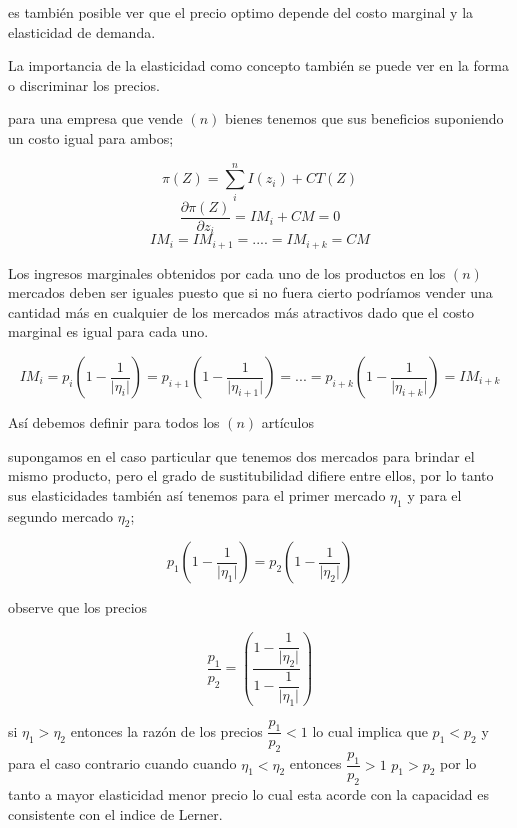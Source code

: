 \documentclass[12pt]{article}
\providecommand{\abs}[1]{\lvert#1\rvert}
\begin{document}
es también posible ver que el precio optimo depende del costo marginal y la elasticidad de demanda.




La importancia de la elasticidad como concepto también se puede ver en la forma o discriminar los precios.

para una empresa que vende $(n)$ bienes tenemos que sus beneficios suponiendo un costo igual para ambos;

$$\pi(Z)=\sum_{i}^{n}I(z_{i}) + CT(Z)$$
$$\dfrac{\partial \pi(Z)}{\partial z_{i}}=IM_{i}+CM=0$$
$$IM_{i}=IM_{i+1}=....=IM_{i+k}=CM$$

Los ingresos marginales obtenidos por cada uno de los productos en los $(n)$ mercados deben ser iguales puesto que si no fuera cierto podríamos vender una cantidad más en cualquier de los mercados más atractivos dado que el costo marginal es igual para cada uno.




$$IM_{i}=p_{i}\left(1-\dfrac{1}{\abs{\eta_{i}}}\right)= p_{i+1}\left(1-\dfrac{1}{\abs{\eta_{i+1}}}\right) =  ... = p_{i+k}\left(1-\dfrac{1}{\abs{\eta_{i+k}}}\right) = IM_{i+k} $$







Así debemos definir para todos los $(n)$ artículos 


supongamos en el caso particular que tenemos dos mercados para brindar el mismo producto, pero el grado de sustitubilidad difiere entre ellos, por lo tanto sus elasticidades también así tenemos para el primer mercado $\eta_{1}$ y para el segundo mercado $\eta_{2}$;




$$p_{1}\left(1-\dfrac{1}{\abs{\eta_{1}}}\right) =p_{2}\left(1-\dfrac{1}{\abs{\eta_{2}}}\right)$$

observe que los precios 

$$ \dfrac{p_{1}}{p_{2}} = \left( \dfrac {1-\dfrac {1} {\abs {\eta_{2}} }} { 1 -\dfrac {1} { \abs { \eta_{1}}}}\right)   $$

si $\eta_{1} > \eta_{2}$ entonces la razón de los precios $ \dfrac{p_{1}}{p_{2}}< 1$ lo cual implica que $p_{1}<p_{2}$  y para el caso contrario cuando cuando $\eta_{1} < \eta_{2}$ entonces $\dfrac{p_{1}}{p_{2}}>1 $ $p_{1}>p_{2}$ por lo tanto a mayor elasticidad menor precio lo cual esta acorde con la capacidad es consistente con el indice de Lerner.

\\
\end{document}
